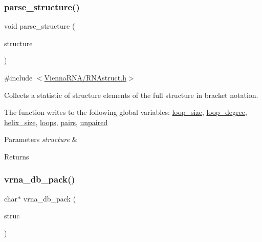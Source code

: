 \subsubsection{\texorpdfstring{parse\+\_\+structure()}{parse\_structure()}}
{\footnotesize\ttfamily void parse\+\_\+structure (\begin{DoxyParamCaption}\item[{const char $\ast$}]{structure }\end{DoxyParamCaption})}



{\ttfamily \#include $<$\mbox{\hyperlink{_r_n_astruct_8h}{Vienna\+R\+N\+A/\+R\+N\+Astruct.\+h}}$>$}



Collects a statistic of structure elements of the full structure in bracket notation. 

The function writes to the following global variables\+: \mbox{\hyperlink{group__struct__utils_ga3f31e0e48125601bfa57b52f8b038e8e}{loop\+\_\+size}}, \mbox{\hyperlink{group__struct__utils_gaef14e2f8ab3f61e8e659ba6b9003b08a}{loop\+\_\+degree}}, \mbox{\hyperlink{group__struct__utils_ga8218c0d581a3fba2a1a56a196abe19a5}{helix\+\_\+size}}, \mbox{\hyperlink{group__struct__utils_ga439fcb9f8d4f9f4d2227fde5fbfecb30}{loops}}, \mbox{\hyperlink{group__struct__utils_ga6341cbb704924824e0236c1dce791032}{pairs}}, \mbox{\hyperlink{group__struct__utils_gadd2f952597e02d66e1116a9d11d252d6}{unpaired}}


\begin{DoxyParams}{Parameters}
{\em structure} & \\
\hline
\end{DoxyParams}
\begin{DoxyReturn}{Returns}

\end{DoxyReturn}
\mbox{\label{group__struct__utils_ga55c4783060a1464f862f858d5599c9e1}} 
\subsubsection{\texorpdfstring{vrna\+\_\+db\+\_\+pack()}{vrna\_db\_pack()}}
{\footnotesize\ttfamily char$\ast$ vrna\+\_\+db\+\_\+pack (\begin{DoxyParamCaption}\item[{const char $\ast$}]{struc }\end{DoxyParamCaption})}



